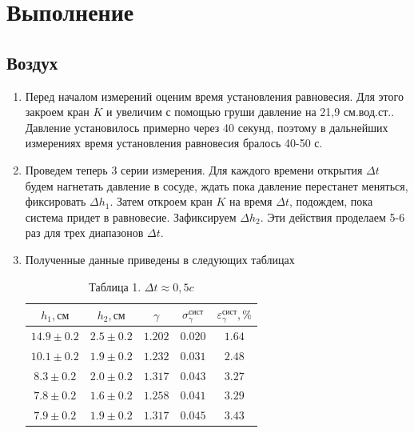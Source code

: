 \documentclass[a4paper]{article}
\begin{document}
\section{Выполнение}

\subsection{Воздух}
\begin{enumerate}


\item Перед началом измерений оценим время установления равновесия.  Для этого закроем кран $K$ и увеличим с помощью груши давление на 21,9 см.вод.ст.. Давление установилось примерно через 40 секунд, поэтому в дальнейших измерениях время установления равновесия бралось 40-50 с.

\item Проведем теперь 3 серии измерения. Для каждого времени открытия $\Delta t$ будем нагнетать давление в сосуде, ждать пока давление перестанет меняться, фиксировать $\Delta h_1$. Затем откроем кран $K$ на время $\Delta t$, подождем, пока система придет в равновесие. Зафиксируем $\Delta h_2$. Эти действия проделаем 5-6 раз для трех диапазонов $\Delta t$.
\item Полученные данные приведены в следующих таблицах
\begin{table}[h!]
    \centering
    \begin{tabular}{|c|c|c|c|c|}
        \hline
        $h_1, \text{см}$ & $h_2, \text{см}$ & $\gamma$ & $\sigma_\gamma^{\text{сист}}$ & $\varepsilon_\gamma^{\text{сист}}, \%$ \\
        \hline
        $14.9 \pm 0.2$ & $2.5 \pm 0.2$ & $1.202$ & $0.020$ & $1.64$ \\ \hline
        $10.1 \pm 0.2$ & $1.9 \pm 0.2$ & $1.232$ & $0.031$ & $2.48$ \\ \hline
        $8.3 \pm 0.2$ & $2.0 \pm 0.2$ & $1.317$ & $0.043$ & $3.27$ \\ \hline
        $7.8 \pm 0.2$ & $1.6 \pm 0.2$ & $1.258$ & $0.041$ & $3.29$ \\ \hline
        $7.9 \pm 0.2$ & $1.9 \pm 0.2$ & $1.317$ & $0.045$ & $3.43$ \\ \hline
    \end{tabular}
    \caption{Таблица 1. $\Delta t \approx 0,5 c$}
\end{table}


\end{enumerate}
\end{document}
